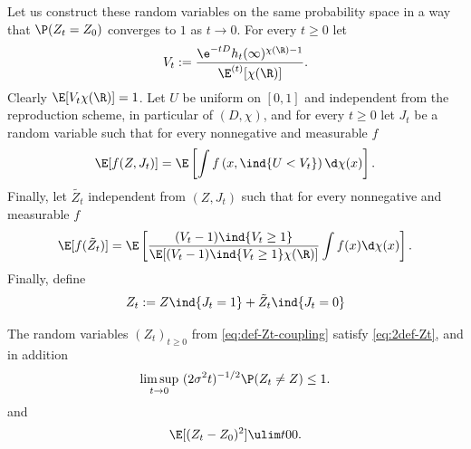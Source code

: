 \documentclass[10pt,a4paper]{article}
\newcommand{\repscheme}{reproduction scheme\xspace}
\begin{document}
Let us construct these random variables on the same probability space in a way that $\P(Z_t = Z_0)$ converges to $1$ as $t\to 0$. 
For every $t\geq 0$ let 
\[ V_t := \frac{\e^{-tD} h_t(\infty)^{\chi(\R)-1}}{\E^{(t)}[\chi(\R)]} . \]
Clearly $\E[V_t \chi(\R)]=1$. 
Let $U$ be uniform on $[0,1]$ and independent from the \repscheme, in particular of $(D,\chi)$, 
and for every $t\geq 0$ let $J_t$ be a random variable such that for every nonnegative and measurable $f$
\[ \E[f(Z, J_t)] = \E\left[ \int f\left( x, \ind{U < V_t}\right) \d\chi(x) \right] . \]
Finally, let $\tilde{Z_t}$ independent from $(Z, J_t)$ such that for every nonnegative and measurable $f$
\[ \E[f(\tilde Z_t)] = \E\left[ \frac{(V_t-1) \ind{V_t\geq 1}}{\E[(V_t-1) \ind{V_t\geq 1} \chi(\R)]} \int f(x) \d\chi(x) \right] . \]
Finally, define
\begin{equation}\label{eq:def-Zt-coupling}
Z_t := Z \ind{J_t=1} + \tilde Z_t \ind{J_t=0}
\end{equation} 

\begin{lemma}\label{lem:coupling-explicit}
The random variables $(Z_t)_{t\geq 0}$ from \eqref{eq:def-Zt-coupling} satisfy \eqref{eq:2def-Zt}, and in addition
\begin{equation}
\limsup_{t\to 0} \ (2\sigma^2 t)^{-1/2} \P(Z_t \neq Z) \leq 1 .
\end{equation}
and
\begin{equation}\label{eq:coupling-first-step}
\E[(Z_t - Z_0)^2] \ulim t 0 0 .
\end{equation}
\end{lemma}
\end{document}
